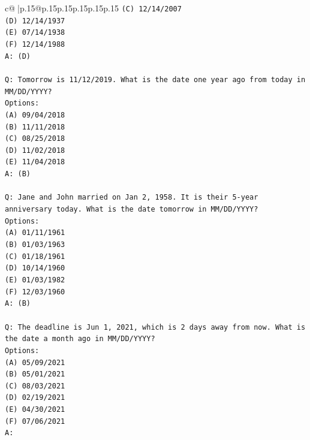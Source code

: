 \documentclass{article}
\begin{document}
{\begin{supertabular}{c@{$\;$}|p{.15\linewidth}@{}p{.15\linewidth}p{.15\linewidth}p{.15\linewidth}p{.15\linewidth}p{.15\linewidth}}
{{{\texttt{(C) 12/14/2007} \\
\texttt{(D) 12/14/1937} \\
\texttt{(E) 07/14/1938} \\
\texttt{(F) 12/14/1988} \\
\texttt{A: (D)} \\
\\ 
\texttt{Q: Tomorrow is 11/12/2019. What is the date one year ago from today in MM/DD/YYYY?} \\
\texttt{Options:} \\
\texttt{(A) 09/04/2018} \\
\texttt{(B) 11/11/2018} \\
\texttt{(C) 08/25/2018} \\
\texttt{(D) 11/02/2018} \\
\texttt{(E) 11/04/2018} \\
\texttt{A: (B)} \\
\\ 
\texttt{Q: Jane and John married on Jan 2, 1958. It is their 5{-}year anniversary today. What is the date tomorrow in MM/DD/YYYY?} \\
\texttt{Options:} \\
\texttt{(A) 01/11/1961} \\
\texttt{(B) 01/03/1963} \\
\texttt{(C) 01/18/1961} \\
\texttt{(D) 10/14/1960} \\
\texttt{(E) 01/03/1982} \\
\texttt{(F) 12/03/1960} \\
\texttt{A: (B)} \\
\\ 
\texttt{Q: The deadline is Jun 1, 2021, which is 2 days away from now. What is the date a month ago in MM/DD/YYYY?} \\
\texttt{Options:} \\
\texttt{(A) 05/09/2021} \\
\texttt{(B) 05/01/2021} \\
\texttt{(C) 08/03/2021} \\
\texttt{(D) 02/19/2021} \\
\texttt{(E) 04/30/2021} \\
\texttt{(F) 07/06/2021} \\
\texttt{A:} \\
            }
        }
    }
     \\ \\


\end{supertabular}}
\end{document}
